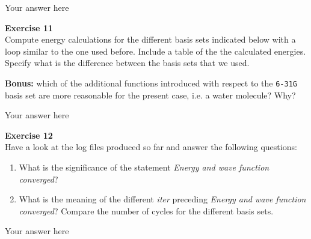 \documentclass{article}
\begin{document}
Your answer here

\begin{mdframed}
\textbf{Exercise 11}\\
Compute energy calculations for the different basis sets indicated below with a loop similar to the one used before.  Include a table of the the calculated energies. Specify what is the difference between the basis sets that we used.

\textbf{Bonus:} which of the additional functions introduced with respect to the \texttt{6-31G} basis set are more reasonable for the present case, i.e. a water molecule? Why?
\end{mdframed}

Your answer here

\begin{mdframed}
\textbf{Exercise 12}\\
Have a look at the log files produced so far and answer the following questions:

\begin{enumerate}
\item What is the significance of the statement \textit{Energy and wave function converged}?


\item What is the meaning of the different \textit{iter} preceding \textit{Energy and wave function converged}?
Compare the number of cycles for the different basis sets.
\end{enumerate}
\end{mdframed}

Your answer here

\end{document}
